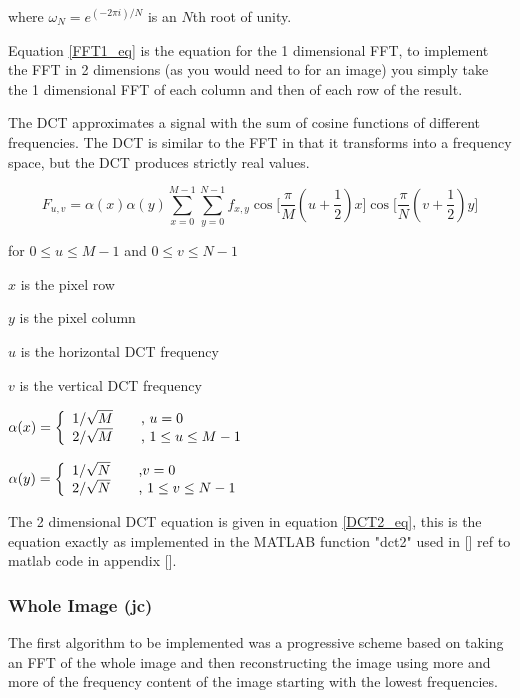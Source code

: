 where
$ \omega _N = e^{(-2 \pi i)/N} $ is an $N$th root of unity.

Equation \ref{FFT1_eq} is the equation for the 1 dimensional FFT, to implement the FFT in 2 dimensions (as you would need to for an image) you simply take the 1 dimensional FFT of each column and then of each row of the result.

The DCT approximates a signal with the sum of cosine functions of different frequencies. The DCT is similar to the FFT in that it transforms into a frequency space, but the DCT produces strictly real values.

\begin{equation}
F_{u,v} = \alpha(x) \alpha(y) \sum_{x=0}^{M-1} \sum_{y=0}^{N-1} f_{x,y} \cos\Big[\dfrac{\pi}{M}(u+\dfrac{1}{2})x\Big]\cos\Big[\dfrac{\pi}{N}(v+\dfrac{1}{2})y\Big]
\label{DCT2_eq}
\end{equation}

for $0 \leq u \leq M - 1 $ and $0 \leq v \leq N - 1 $

$x$ is the pixel row

$y$ is the pixel column

$u$ is the horizontal DCT frequency

$v$ is the vertical DCT frequency

$
  \alpha(x) = \left\{
  \begin{array}{l l}
    1/ \sqrt{M} & \quad \text{, $u = 0$}\\
    2/ \sqrt{M} & \quad \text{, $1 \leq u \leq M - 1$}\\
  \end{array} \right.
$

$
  \alpha(y) = \left\{
  \begin{array}{l l}
    1/ \sqrt{N} & \quad \text{,$ v = 0$}\\
    2/ \sqrt{N} & \quad \text{, $1 \leq v \leq N - 1$}\\
  \end{array} \right.
$

The 2 dimensional DCT equation is given in equation \ref{DCT2_eq}, this is the equation exactly as implemented in the MATLAB function "dct2" used in [] ref to matlab code in appendix [].

\subsubsection{Whole Image (jc)}

The first algorithm to be implemented was a progressive scheme based on taking an FFT of the whole image and then reconstructing the image using more and more of the frequency content of the image starting with the lowest frequencies.

